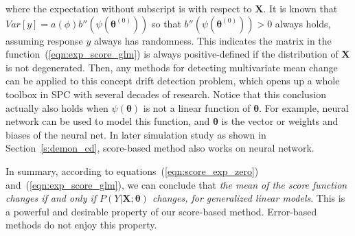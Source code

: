 \documentclass[twoside,11pt]{article}
\begin{document}
where the expectation without subscript is with respect to $\bm {X}$. It is known that $Var[y] = a ( \phi)b''(\psi ( \bm { \theta} ^{ (0)}))$ so that $b''(\psi ( \bm { \theta} ^{ (0)}))>0$ always holds, assuming response $y$ always has randomness. This indicates the matrix in the function~(\ref{eqn:exp_score_glm}) is always positive-defined if the distribution of $\bm {X}$ is not degenerated. Then, any methods for detecting multivariate mean change can be applied to this concept drift detection problem, which opens up a whole toolbox in SPC with several decades of research. Notice that this conclusion actually also holds when $ \psi ( \bm { \theta})$ is not a linear function of $\bm { \theta}$. For example, neural network can be used to model this function, and $\bm { \theta}$ is the vector or weights and biases of the neural net. In later simulation study as shown in Section~\ref{s:demon_cd}, score-based method also works on neural network. 

In summary, according to equations~(\ref{eqn:score_exp_zero}) and~(\ref{eqn:exp_score_glm}), we can conclude that \textit{the mean of the score function changes if and only if $P(Y|\bm{X};\bm{\theta})$ changes, for generalized linear models}. This is a powerful and desirable property of our score-based method. Error-based methods do not enjoy this property. 
\end{document}
